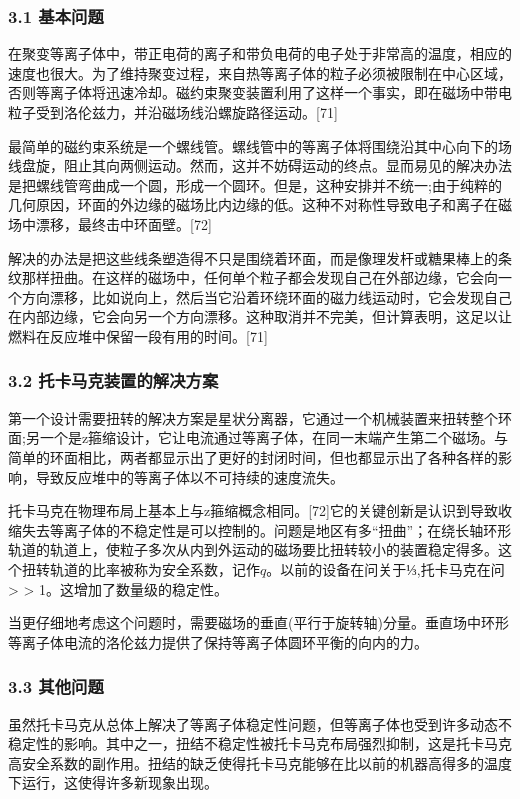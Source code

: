 \subsubsection{3.1 基本问题}
在聚变等离子体中，带正电荷的离子和带负电荷的电子处于非常高的温度，相应的速度也很大。为了维持聚变过程，来自热等离子体的粒子必须被限制在中心区域，否则等离子体将迅速冷却。磁约束聚变装置利用了这样一个事实，即在磁场中带电粒子受到洛伦兹力，并沿磁场线沿螺旋路径运动。[71]

最简单的磁约束系统是一个螺线管。螺线管中的等离子体将围绕沿其中心向下的场线盘旋，阻止其向两侧运动。然而，这并不妨碍运动的终点。显而易见的解决办法是把螺线管弯曲成一个圆，形成一个圆环。但是，这种安排并不统一;由于纯粹的几何原因，环面的外边缘的磁场比内边缘的低。这种不对称性导致电子和离子在磁场中漂移，最终击中环面壁。[72]

解决的办法是把这些线条塑造得不只是围绕着环面，而是像理发杆或糖果棒上的条纹那样扭曲。在这样的磁场中，任何单个粒子都会发现自己在外部边缘，它会向一个方向漂移，比如说向上，然后当它沿着环绕环面的磁力线运动时，它会发现自己在内部边缘，它会向另一个方向漂移。这种取消并不完美，但计算表明，这足以让燃料在反应堆中保留一段有用的时间。[71]
\subsubsection{3.2 托卡马克装置的解决方案}
第一个设计需要扭转的解决方案是星状分离器，它通过一个机械装置来扭转整个环面;另一个是z箍缩设计，它让电流通过等离子体，在同一末端产生第二个磁场。与简单的环面相比，两者都显示出了更好的封闭时间，但也都显示出了各种各样的影响，导致反应堆中的等离子体以不可持续的速度流失。

托卡马克在物理布局上基本上与z箍缩概念相同。[72]它的关键创新是认识到导致收缩失去等离子体的不稳定性是可以控制的。问题是地区有多“扭曲”；在绕长轴环形轨道的轨道上，使粒子多次从内到外运动的磁场要比扭转较小的装置稳定得多。这个扭转轨道的比率被称为安全系数，记作$q$。以前的设备在问关于⅓,托卡马克在问> > 1。这增加了数量级的稳定性。

当更仔细地考虑这个问题时，需要磁场的垂直(平行于旋转轴)分量。垂直场中环形等离子体电流的洛伦兹力提供了保持等离子体圆环平衡的向内的力。
\subsubsection{3.3 其他问题}
虽然托卡马克从总体上解决了等离子体稳定性问题，但等离子体也受到许多动态不稳定性的影响。其中之一，扭结不稳定性被托卡马克布局强烈抑制，这是托卡马克高安全系数的副作用。扭结的缺乏使得托卡马克能够在比以前的机器高得多的温度下运行，这使得许多新现象出现。

